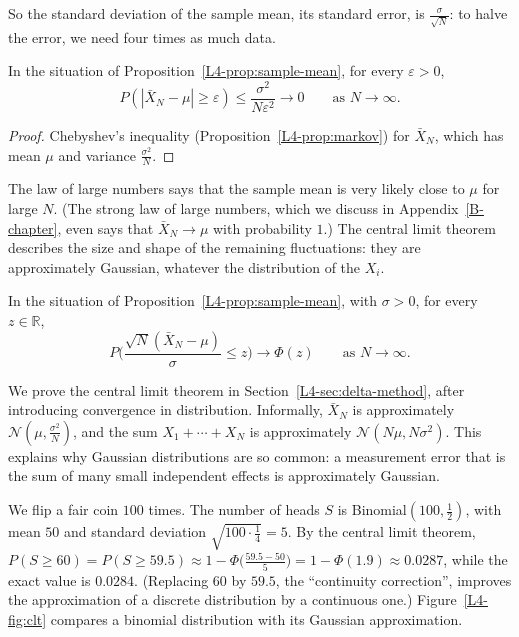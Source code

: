 So the standard deviation of the sample mean, its standard error, is $\frac{\sigma}{\sqrt{N}}$: to halve the error, we need four times as much data.

\begin{theorem}\label{L4-thm:lln}
    In the situation of Proposition~\ref{L4-prop:sample-mean}, for every $\varepsilon > 0$,
    \[P(|\bar X_N - \mu| \geq \varepsilon) \leq \frac{\sigma^2}{N\varepsilon^2} \to 0 \qquad \text{as } N \to \infty.\]
\end{theorem}

\begin{proof}
    Chebyshev's inequality (Proposition~\ref{L4-prop:markov}) for $\bar X_N$, which has mean $\mu$ and variance $\frac{\sigma^2}{N}$.
\end{proof}

The law of large numbers says that the sample mean is very likely close to $\mu$ for large $N$. (The strong law of large numbers, which we discuss in Appendix~\ref{B-chapter}, even says that $\bar X_N \to \mu$ with probability $1$.) The central limit theorem describes the size and shape of the remaining fluctuations: they are approximately Gaussian, whatever the distribution of the $X_i$.

\begin{theorem}\label{L4-thm:clt}
    In the situation of Proposition~\ref{L4-prop:sample-mean}, with $\sigma > 0$, for every $z \in \mathbb{R}$,
    \[P\Big(\frac{\sqrt{N}(\bar X_N - \mu)}{\sigma} \leq z\Big) \to \Phi(z) \qquad \text{as } N \to \infty.\]
\end{theorem}

We prove the central limit theorem in Section~\ref{L4-sec:delta-method}, after introducing convergence in distribution. Informally, $\bar X_N$ is approximately $\mathcal{N}(\mu, \frac{\sigma^2}{N})$, and the sum $X_1 + \cdots + X_N$ is approximately $\mathcal{N}(N\mu, N\sigma^2)$. This explains why Gaussian distributions are so common: a measurement error that is the sum of many small independent effects is approximately Gaussian.

\begin{example}\label{L4-ex:clt-coins}
    We flip a fair coin $100$ times. The number of heads $S$ is Binomial$(100, \frac{1}{2})$, with mean $50$ and standard deviation $\sqrt{100 \cdot \frac{1}{4}} = 5$. By the central limit theorem, $P(S \geq 60) = P(S \geq 59.5) \approx 1 - \Phi\big(\frac{59.5 - 50}{5}\big) = 1 - \Phi(1.9) \approx 0.0287$, while the exact value is $0.0284$. (Replacing $60$ by $59.5$, the ``continuity correction'', improves the approximation of a discrete distribution by a continuous one.) Figure~\ref{L4-fig:clt} compares a binomial distribution with its Gaussian approximation.
\end{example}

